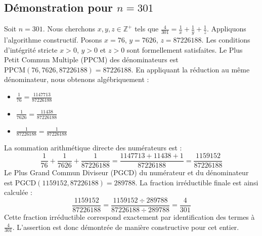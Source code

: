 \documentclass[11pt,a4paper]{article}
\begin{document}
\subsection{Démonstration pour $n = 301$}
Soit $n = 301$. Nous cherchons $x, y, z \in \mathbb{Z}^{+}$ tels que $\frac{4}{301} = \frac{1}{x} + \frac{1}{y} + \frac{1}{z}$.
Appliquons l'algorithme constructif. Posons $x = 76$, $y = 7626$, $z = 87226188$.
Les conditions d'intégrité stricte $x > 0$, $y > 0$ et $z > 0$ sont formellement satisfaites.
Le Plus Petit Commun Multiple (PPCM) des dénominateurs est $\text{PPCM}(76, 7626, 87226188) = 87226188$.
En appliquant la réduction au même dénominateur, nous obtenons algébriquement :
\begin{itemize}
    \item $\frac{1}{76} = \frac{1147713}{87226188}$
    \item $\frac{1}{7626} = \frac{11438}{87226188}$
    \item $\frac{1}{87226188} = \frac{1}{87226188}$
\end{itemize}
La sommation arithmétique directe des numérateurs est :
$$ \frac{1}{76} + \frac{1}{7626} + \frac{1}{87226188} = \frac{1147713 + 11438 + 1}{87226188} = \frac{1159152}{87226188} $$
Le Plus Grand Commun Diviseur (PGCD) du numérateur et du dénominateur est $\text{PGCD}(1159152, 87226188) = 289788$.
La fraction irréductible finale est ainsi calculée :
$$ \frac{1159152}{87226188} = \frac{1159152 \div 289788}{87226188 \div 289788} = \frac{4}{301} $$
Cette fraction irréductible correspond exactement par identification des termes à $\frac{4}{301}$. L'assertion est donc démontrée de manière constructive pour cet entier.
\end{document}
